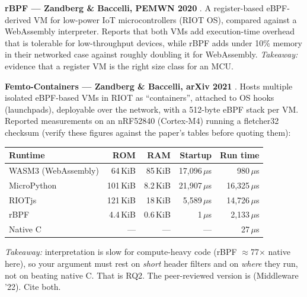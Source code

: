 \documentclass[10pt,a4paper]{article}
\begin{document}
\textbf{rBPF --- Zandberg \& Baccelli, PEMWN 2020} \cite{rbpf20}. A register-based eBPF-derived VM for low-power IoT microcontrollers (RIOT OS), compared against a WebAssembly interpreter. Reports that both VMs add execution-time overhead that is tolerable for low-throughput devices, while rBPF adds under 10\% memory in their networked case against roughly doubling it for WebAssembly. \emph{Takeaway:} evidence that a register VM is the right size class for an MCU.

\textbf{Femto-Containers --- Zandberg \& Baccelli, arXiv 2021} \cite{fc21}. Hosts multiple isolated eBPF-based VMs in RIOT as ``containers'', attached to OS hooks (launchpads), deployable over the network, with a 512-byte eBPF stack per VM. Reported measurements on an nRF52840 (Cortex-M4) running a fletcher32 checksum (verify these figures against the paper's tables before quoting them):

\begin{center}
\begin{tabular}{@{}lrrrr@{}}
\toprule
\textbf{Runtime} & \textbf{ROM} & \textbf{RAM} & \textbf{Startup} & \textbf{Run time} \\
\midrule
WASM3 (WebAssembly) & 64\,KiB & 85\,KiB & 17{,}096\,$\mu$s & 980\,$\mu$s \\
MicroPython & 101\,KiB & 8.2\,KiB & 21{,}907\,$\mu$s & 16{,}325\,$\mu$s \\
RIOTjs & 121\,KiB & 18\,KiB & 5{,}589\,$\mu$s & 14{,}726\,$\mu$s \\
rBPF & 4.4\,KiB & 0.6\,KiB & 1\,$\mu$s & 2{,}133\,$\mu$s \\
Native C & --- & --- & --- & 27\,$\mu$s \\
\bottomrule
\end{tabular}
\end{center}
\emph{Takeaway:} interpretation is slow for compute-heavy code (rBPF $\approx$77$\times$ native here), so your argument must rest on \emph{short} header filters and on \emph{where} they run, not on beating native C. That is RQ2. The peer-reviewed version is \cite{fc22} (Middleware '22). Cite both.
\end{document}
